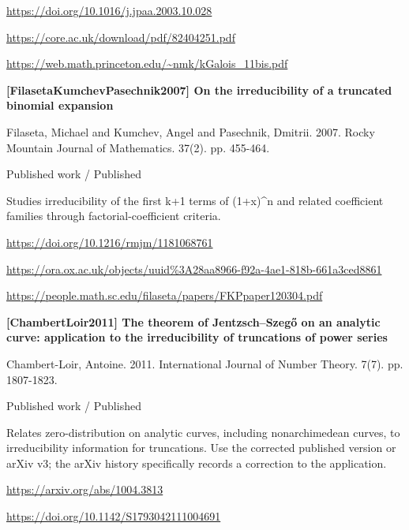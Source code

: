 \documentclass[11pt,a4paper,oneside,openany]{book}
\begin{document}
{\footnotesize\url{https://doi.org/10.1016/j.jpaa.2003.10.028}}\par
{\footnotesize\url{https://core.ac.uk/download/pdf/82404251.pdf}}\par
{\footnotesize\url{https://web.math.princeton.edu/~nmk/kGalois_11bis.pdf}}\par
\vspace{9pt}
\hypertarget{ref:FilasetaKumchevPasechnik2007}{}
{\sffamily\bfseries\color{atlasgreen}[FilasetaKumchevPasechnik2007] On the irreducibility of a truncated binomial expansion}\par
\color{black} Filaseta, Michael and Kumchev, Angel and Pasechnik, Dmitrii. 2007. Rocky Mountain Journal of Mathematics. 37(2). pp. 455-464.\par
{\small\sffamily\color{atlasgold}Published work / Published}\par
\color{black} Studies irreducibility of the first k+1 terms of (1+x)\textasciicircum{}n and related coefficient families through factorial-coefficient criteria.\par
{\footnotesize\url{https://doi.org/10.1216/rmjm/1181068761}}\par
{\footnotesize\url{https://ora.ox.ac.uk/objects/uuid%3A28aa8966-f92a-4ae1-818b-661a3ced8861}}\par
{\footnotesize\url{https://people.math.sc.edu/filaseta/papers/FKPpaper120304.pdf}}\par
\vspace{9pt}
\hypertarget{ref:ChambertLoir2011}{}
{\sffamily\bfseries\color{atlasgreen}[ChambertLoir2011] The theorem of Jentzsch--Szegő on an analytic curve: application to the irreducibility of truncations of power series}\par
\color{black} Chambert-Loir, Antoine. 2011. International Journal of Number Theory. 7(7). pp. 1807-1823.\par
{\small\sffamily\color{atlasgold}Published work / Published}\par
\color{black} Relates zero-distribution on analytic curves, including nonarchimedean curves, to irreducibility information for truncations. Use the corrected published version or arXiv v3; the arXiv history specifically records a correction to the application.\par
{\footnotesize\url{https://arxiv.org/abs/1004.3813}}\par
{\footnotesize\url{https://doi.org/10.1142/S1793042111004691}}\par
\vspace{9pt}
\end{document}
